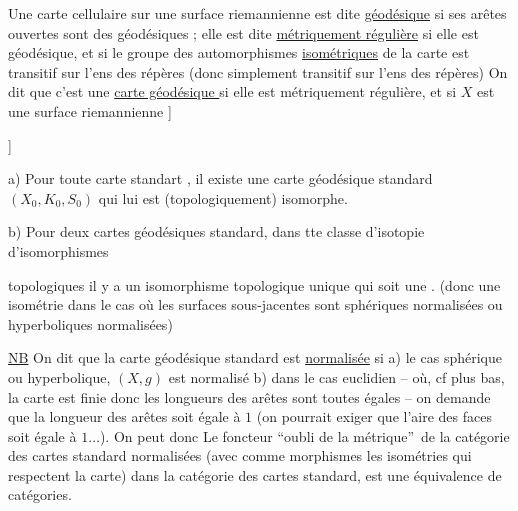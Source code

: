 Une carte cellulaire sur une surface riemannienne  est dite \uline{géodésique} si  ses arêtes ouvertes sont des  géodésiques ; elle est dite \uline{métriquement régulière} si elle est géodésique, et si le groupe des automorphismes \uline{isométriques} de la carte est transitif sur l'ens des répères (donc simplement transitif sur l'ens des répères) On dit que c'est une \uline{carte géodésique } si elle est métriquement régulière,  et si  $X$  est une surface riemannienne    ]

   ]

a) Pour toute carte standart , il existe  une carte géodésique standard $(X_0,K_0,S_0)$ qui lui est (topologiquement) isomorphe.

 b) Pour deux cartes géodésiques standard, dans tte classe d'isotopie d'isomorphismes

topologiques il y a un isomorphisme topologique unique qui soit une  . (donc une isométrie dans le cas où les surfaces sous-jacentes sont  sphériques normalisées ou hyperboliques normalisées)


\uline{NB} On dit que la carte géodésique standard est \uline{normalisée} si a)  le cas sphérique ou hyperbolique, $(X,g)$ est normalisé b) dans le cas euclidien -- où, cf plus bas, la carte est  finie  donc les longueurs des arêtes sont toutes égales -- on demande que la longueur des arêtes soit égale à $1$ (on pourrait   exiger que l'aire des faces soit égale à $1\ldots$). On peut donc   Le foncteur \textquotedblleft oubli de la métrique\textquotedblright\ de la catégorie des cartes    standard normalisées (avec comme morphismes les isométries qui respectent la carte) dans la catégorie des cartes standard, est une équivalence de catégories.

